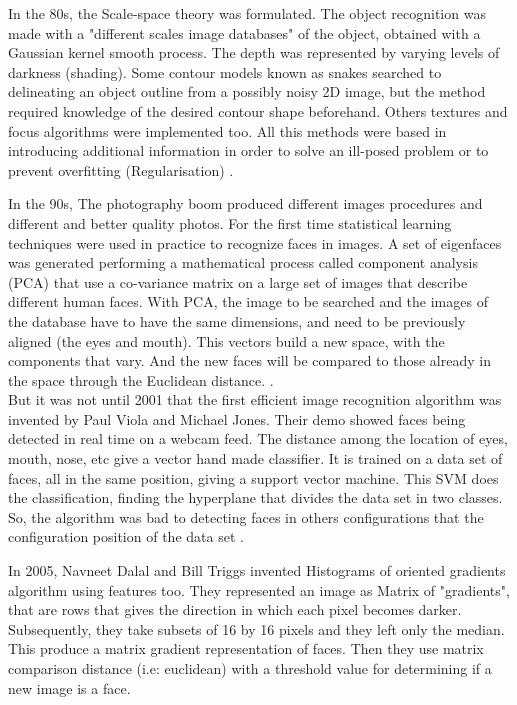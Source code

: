 \documentclass[10pt]{article}
\begin{document}
In the 80s, the Scale-space theory was formulated. The object recognition was made with a "different scales image databases" of the object, obtained with a Gaussian kernel smooth process. The depth was represented by varying levels of darkness (shading). Some contour models known as snakes searched to delineating an object outline from a possibly noisy 2D image, but the method required knowledge of the desired contour shape beforehand. Others textures and focus algorithms were implemented too. All this methods were based in introducing additional information in order to solve an ill-posed problem or to prevent overfitting (Regularisation) \cite{brooks1999cambrian}.

In the 90s, The photography boom produced different images procedures and different and better quality photos.  For the first time statistical learning techniques were used in practice to recognize faces in images. A set of eigenfaces was generated performing a mathematical process called component analysis (PCA) that use a co-variance matrix on a large set of images that describe different human faces. With PCA, the image to be searched and the images of the database have to have the same dimensions, and need to be previously aligned (the eyes and mouth). This vectors build a new space, with the components that vary. And the new faces will be compared to those already in the space through the Euclidean distance. \cite{turk1991face}. \\
But it was not until 2001 that the first efficient image recognition algorithm was invented by Paul Viola and Michael Jones. Their demo showed faces being detected in real time on a webcam feed.  The distance among the location of eyes, mouth, nose, etc give a vector hand made classifier.  It is trained on a data set of faces, all in the same position, giving a support vector machine. This SVM does the classification, finding the hyperplane that divides the data set in two classes. So, the algorithm was bad to detecting faces in others configurations that the configuration position of the data set \cite{viola2001rapid}.

    
In 2005, Navneet Dalal and Bill Triggs invented Histograms of oriented gradients algorithm using features too. \cite{dalal2005histograms} They represented an image as Matrix of "gradients", that are rows that gives the direction in which each pixel becomes darker. Subsequently, they take subsets of 16 by 16 pixels and they left only the median. This produce a matrix gradient representation of faces. Then they use matrix comparison distance (i.e: euclidean) with a threshold value for determining if a new image is a face.\\
\end{document}
